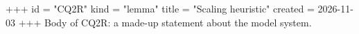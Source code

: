 +++
id = "CQ2R"
kind = "lemma"
title = "Scaling heuristic"
created = 2026-11-03
+++
Body of CQ2R: a made-up statement about the model system.
